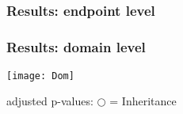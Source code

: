 \subsection{}
\begin{frame}
\frametitle{Results: endpoint level}


\end{frame}
\begin{frame}
\frametitle{Results: domain level}

\texttt{[image: Dom]}

\bigskip 

adjusted p-values: $\bigcirc$ = Inheritance

\end{frame}
